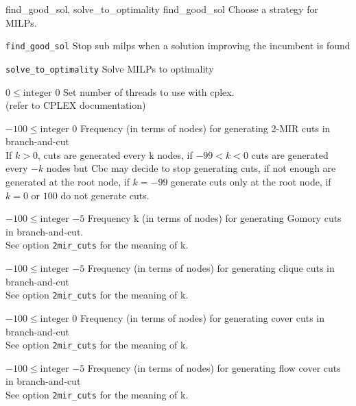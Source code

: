 %
{\ttfamily find\_good\_sol, solve\_to\_optimality}%
{find\_good\_sol}%
{Choose a strategy for MILPs.}%
{\begin{list}{}{
\setlength{\parsep}{0em}
\setlength{\leftmargin}{5ex}
\setlength{\labelwidth}{2ex}
\setlength{\itemindent}{0ex}
\setlength{\topsep}{0pt}}
\item[\texttt{find\_good\_sol}] Stop sub milps when a solution improving the incumbent is found
\item[\texttt{solve\_to\_optimality}] Solve MILPs to optimality
\end{list}
}

%
{$0\leq\textrm{integer}$}%
{$0$}%
{Set number of threads to use with cplex.\\
(refer to CPLEX documentation)}%
{}

%
{$-100\leq\textrm{integer}$}%
{$0$}%
{Frequency (in terms of nodes) for generating 2-MIR cuts in branch-and-cut\\
If $k > 0$, cuts are generated every k nodes, if $-99 < k < 0$ cuts are generated every $-k$ nodes but Cbc may decide to stop generating cuts, if not enough are generated at the root node, if $k=-99$ generate cuts only at the root node, if $k=0$ or $100$ do not generate cuts.}%
{}

%
{$-100\leq\textrm{integer}$}%
{$-5$}%
{Frequency k (in terms of nodes) for generating Gomory cuts in branch-and-cut.\\
See option \texttt{2mir\_cuts} for the meaning of k.}%
{}

%
{$-100\leq\textrm{integer}$}%
{$-5$}%
{Frequency (in terms of nodes) for generating clique cuts in branch-and-cut\\
See option \texttt{2mir\_cuts} for the meaning of k.}%
{}

%
{$-100\leq\textrm{integer}$}%
{$0$}%
{Frequency (in terms of nodes) for generating cover cuts in branch-and-cut\\
See option \texttt{2mir\_cuts} for the meaning of k.}%
{}

%
{$-100\leq\textrm{integer}$}%
{$-5$}%
{Frequency (in terms of nodes) for generating flow cover cuts in branch-and-cut\\
See option \texttt{2mir\_cuts} for the meaning of k.}%
{}

